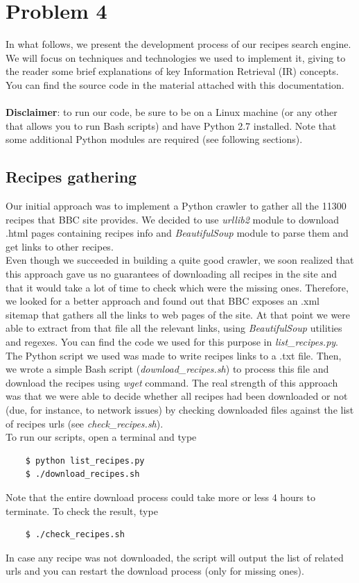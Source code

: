 
\section{Problem 4}

In what follows, we present the development process of our recipes search engine. We will focus on techniques and technologies we used to implement it, giving to the reader some brief explanations of key Information Retrieval (IR) concepts. You can find the source code in the material attached with this documentation.\\\\
\textbf{Disclaimer}: to run our code, be sure to be on a Linux machine (or any other that allows you to run Bash scripts) and have Python 2.7 installed. Note that some additional Python modules are required (see following sections).


\subsection{Recipes gathering}

Our initial approach was to implement a Python crawler to gather all the 11300 recipes that BBC site\cite{bbc} provides. We decided to use \textit{urllib2}\cite{urllib2} module to download .html pages containing recipes info and \textit{BeautifulSoup}\cite{beaut_soup} module to parse them and get links to other recipes.\\
Even though we succeeded in building a quite good crawler, we soon realized that this approach gave us no guarantees of downloading all recipes in the site and that it would take a lot of time to check which were the missing ones. Therefore, we looked for a better approach and found out that BBC exposes an .xml sitemap that gathers all the links to web pages of the site. At that point we were able to extract from that file all the relevant links, using \textit{BeautifulSoup}\cite{beaut_soup} utilities and regexes. You can find the code we used for this purpose in \textit{list\_recipes.py}.\\
The Python script we used was made to write recipes links to a .txt file. Then, we wrote a simple Bash script (\textit{download\_recipes.sh}) to process this file and download the recipes using \textit{wget} command. The real strength of this approach was that we were able to decide whether all recipes had been downloaded or not (due, for instance, to network issues) by checking downloaded files against the list of recipes urls (see \textit{check\_recipes.sh}).\\
To run our scripts, open a terminal and type
\begin{lstlisting}
	$ python list_recipes.py
	$ ./download_recipes.sh
\end{lstlisting}
Note that the entire download process could take more or less 4 hours to terminate. To check the result, type
\begin{lstlisting}
	$ ./check_recipes.sh
\end{lstlisting}
In case any recipe was not downloaded, the script will output the list of related urls and you can restart the download process (only for missing ones).


